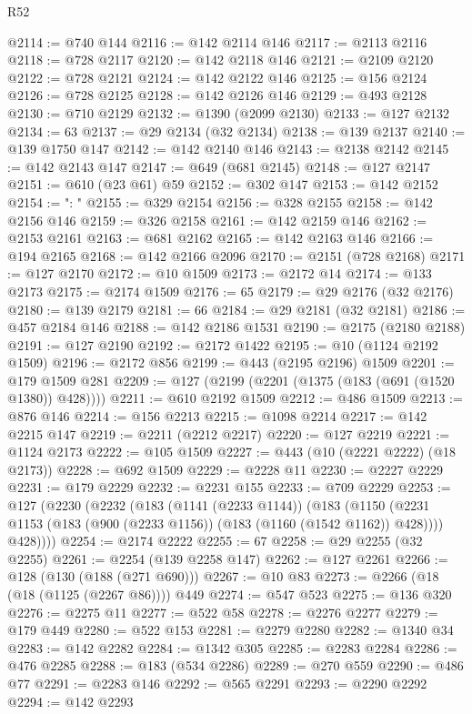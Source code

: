 \begin{lexlean}{R52}
\begin{coremodule}
@2114 := @740 @144
@2116 := @142 @2114 @146
@2117 := @2113 @2116
@2118 := @728 @2117
@2120 := @142 @2118 @146
@2121 := @2109 @2120
@2122 := @728 @2121
@2124 := @142 @2122 @146
@2125 := @156 @2124
@2126 := @728 @2125
@2128 := @142 @2126 @146
@2129 := @493 @2128
@2130 := @710 @2129
@2132 := @1390 (@2099 @2130)
@2133 := @127 @2132
@2134 := 63
@2137 := @29 @2134 (@32 @2134)
@2138 := @139 @2137
@2140 := @139 @1750 @147
@2142 := @142 @2140 @146
@2143 := @2138 @2142
@2145 := @142 @2143 @147
@2147 := @649 (@681 @2145)
@2148 := @127 @2147
@2151 := @610 (@23 @61) @59
@2152 := @302 @147
@2153 := @142 @2152
@2154 := ": "
@2155 := @329 @2154
@2156 := @328 @2155
@2158 := @142 @2156 @146
@2159 := @326 @2158
@2161 := @142 @2159 @146
@2162 := @2153 @2161
@2163 := @681 @2162
@2165 := @142 @2163 @146
@2166 := @194 @2165
@2168 := @142 @2166 @2096
@2170 := @2151 (@728 @2168)
@2171 := @127 @2170
@2172 := @10 @1509
@2173 := @2172 @14
@2174 := @133 @2173
@2175 := @2174 @1509
@2176 := 65
@2179 := @29 @2176 (@32 @2176)
@2180 := @139 @2179
@2181 := 66
@2184 := @29 @2181 (@32 @2181)
@2186 := @457 @2184 @146
@2188 := @142 @2186 @1531
@2190 := @2175 (@2180 @2188)
@2191 := @127 @2190
@2192 := @2172 @1422
@2195 := @10 (@1124 @2192 @1509)
@2196 := @2172 @856
@2199 := @443 (@2195 @2196) @1509
@2201 := @179 @1509 @281
@2209 := @127 (@2199 (@2201 (@1375 (@183 (@691 (@1520 @1380)) @428))))
@2211 := @610 @2192 @1509
@2212 := @486 @1509
@2213 := @876 @146
@2214 := @156 @2213
@2215 := @1098 @2214
@2217 := @142 @2215 @147
@2219 := @2211 (@2212 @2217)
@2220 := @127 @2219
@2221 := @1124 @2173
@2222 := @105 @1509
@2227 := @443 (@10 (@2221 @2222) (@18 @2173))
@2228 := @692 @1509
@2229 := @2228 @11
@2230 := @2227 @2229
@2231 := @179 @2229
@2232 := @2231 @155
@2233 := @709 @2229
@2253 := @127
    (@2230
      (@2232
        (@183
          (@1141 (@2233 @1144))
          (@183
            (@1150 (@2231 @1153 (@183 (@900 (@2233 @1156)) (@183 (@1160 (@1542 @1162)) @428))))
            @428))))
@2254 := @2174 @2222
@2255 := 67
@2258 := @29 @2255 (@32 @2255)
@2261 := @2254 (@139 @2258 @147)
@2262 := @127 @2261
@2266 := @128 (@130 (@188 (@271 @690)))
@2267 := @10 @83
@2273 := @2266 (@18 (@18 (@1125 (@2267 @86)))) @449
@2274 := @547 @523
@2275 := @136 @320
@2276 := @2275 @11
@2277 := @522 @58
@2278 := @2276 @2277
@2279 := @179 @449
@2280 := @522 @153
@2281 := @2279 @2280
@2282 := @1340 @34
@2283 := @142 @2282
@2284 := @1342 @305
@2285 := @2283 @2284
@2286 := @476 @2285
@2288 := @183 (@534 @2286)
@2289 := @270 @559
@2290 := @486 @77
@2291 := @2283 @146
@2292 := @565 @2291
@2293 := @2290 @2292
@2294 := @142 @2293

\end{coremodule}
\end{lexlean}
